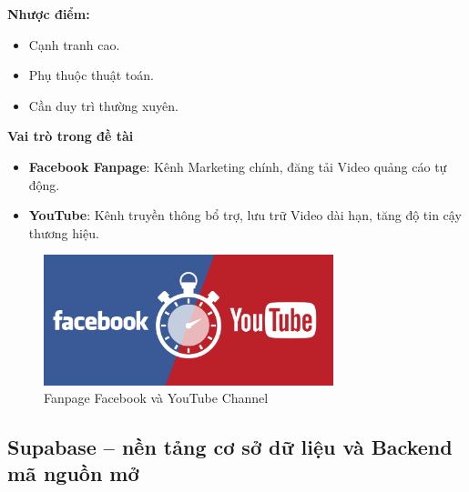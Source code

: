 \textbf{Nhược điểm:}
\begin{itemize}
    \item Cạnh tranh cao.
    \item Phụ thuộc thuật toán.
    \item Cần duy trì thường xuyên.
\end{itemize}

\textbf{Vai trò trong đề tài}
\begin{itemize}
    \item \textbf{Facebook Fanpage}: Kênh Marketing chính, đăng tải Video quảng cáo tự động.
    \item \textbf{YouTube}: Kênh truyền thông bổ trợ, lưu trữ Video dài hạn, tăng độ tin cậy thương hiệu.
\end{itemize}

\begin{figure}[h!]
    \centering
    \includegraphics[width=0.75\textwidth]{img/Picture7.png}
    
    \caption{ Fanpage Facebook và YouTube Channel}
    \label{fig:fb-yt}
\end{figure}


\subsection{Supabase – nền tảng cơ sở dữ liệu và Backend mã nguồn mở}

